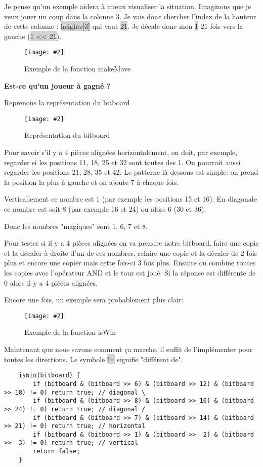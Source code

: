 \documentclass[a4paper]{article}
\newcommand{\img}[3][]{
    \begin{figure}[H]
        \centering
        \texttt{[image: \#2]}
        \caption{#1}    
    \end{figure}
}
\newcommand{\inlinecode}[1]{\colorbox{lightgray}{#1}}
\newcommand{\ptitle}[1]{\vspace{10pt}
{\large \textbf{#1}}}
\begin{document}
    Je pense qu'un exemple aidera à mieux visualiser la situation. Imaginons que je veux jouer un coup dans la colonne 3. Je vais donc chercher l'index de la hauteur de cette colonne : \inlinecode{heights[3]} qui vaut \inlinecode{21}. Je décale donc mon \inlinecode{1} 21 fois vers la gauche (\inlinecode{1 << 21}).

    \img[Exemple de la fonction makeMove]{Images/ExempleMakeMove.png}{1}

    \newpage
    \ptitle{Est-ce qu'un joueur à gagné ?}

    Reprenons la représentation du bitboard
    \img[Représentation du bitboard]{Images/BitBoard.png}{0.5}
    Pour savoir s'il y a 4 pièces alignées horizontalement, on doit, par exemple, regarder si les positions 11, 18, 25 et 32 sont toutes des 1. On pourrait aussi regarder les positions 21, 28, 35 et 42. Le patterne là-dessous est simple: on prend la position la plus à gauche et on ajoute 7 à chaque fois.

    Verticallement ce nombre est 1 (par exemple les positions 15 et 16). En diagonale ce nombre est soit 8 (par exemple 16 et 24) ou alors 6 (30 et 36).

    Donc les nombres "magiques" sont 1, 6, 7 et 8.

    Pour tester si il y a 4 pièces alignées on va prendre notre bitboard, faire une copie et la décaler à droite d'un de ces nombres, refaire une copie et la décaler de 2 fois plus et encore une copier mais cette fois-ci 3 fois plus. Ensuite on combine toutes les copies avec l'opérateur AND et le tour est joué. Si la réponse est différente de 0 alors il y a 4 pièces alignées.

    Encore une fois, un exemple sera probablement plus clair:
    \img[Exemple de la fonction isWin]{Images/ExempleIsWin.png}{0.8}

    Maintenant que nous savons comment ça marche, il suffit de l'implémenter pour toutes les directions. Le symbole \inlinecode{!=} signifie "différent de".
    \begin{lstlisting}
    isWin(bitboard) {
        if (bitboard & (bitboard >> 6) & (bitboard >> 12) & (bitboard >> 18) != 0) return true; // diagonal \
        if (bitboard & (bitboard >> 8) & (bitboard >> 16) & (bitboard >> 24) != 0) return true; // diagonal /
        if (bitboard & (bitboard >> 7) & (bitboard >> 14) & (bitboard >> 21) != 0) return true; // horizontal
        if (bitboard & (bitboard >> 1) & (bitboard >>  2) & (bitboard >>  3) != 0) return true; // vertical
        return false;
    }
    \end{lstlisting}
\end{document}
